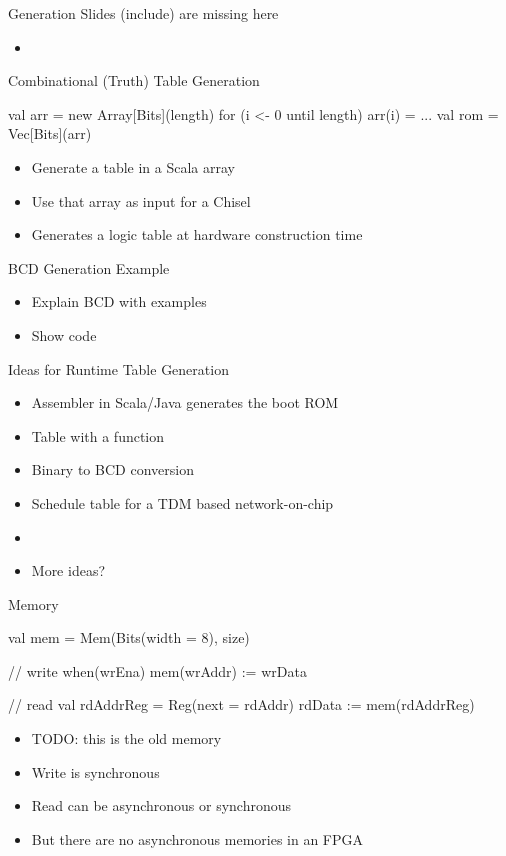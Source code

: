%

\begin{frame}[fragile]{Generation Slides (include) are missing here}
\begin{itemize}
\item 
\end{itemize}
\end{frame}

\begin{frame}[fragile]{Combinational (Truth) Table Generation}
\begin{chisel}
val arr = new Array[Bits](length)
for (i <- 0 until length) {
  arr(i) = ...
}
val rom = Vec[Bits](arr)
\end{chisel}
\begin{itemize}
\item Generate a table in a Scala array
\item Use that array as input for a Chisel 
\item Generates a logic table at hardware construction time
\end{itemize}
\end{frame}

\begin{frame}[fragile]{BCD Generation Example}
\begin{itemize}
\item Explain BCD with examples
\item Show code
\end{itemize}
\end{frame}

\begin{frame}[fragile]{Ideas for Runtime Table Generation}
\begin{itemize}
\item Assembler in Scala/Java generates the boot ROM
\item Table with a  function
\item Binary to BCD conversion
\item Schedule table for a TDM based network-on-chip
\item 
\item More ideas?
\end{itemize}
\end{frame}

\begin{frame}[fragile]{Memory}
\begin{chisel}
val mem = Mem(Bits(width = 8), size)

// write
when(wrEna) {
  mem(wrAddr) := wrData
}

// read
val rdAddrReg = Reg(next = rdAddr)
rdData := mem(rdAddrReg)
\end{chisel}
\begin{itemize}
\item TODO: this is the old memory
\item Write is synchronous
\item Read can be asynchronous or synchronous
\item But there are no asynchronous memories in an FPGA
\end{itemize}
\end{frame}

